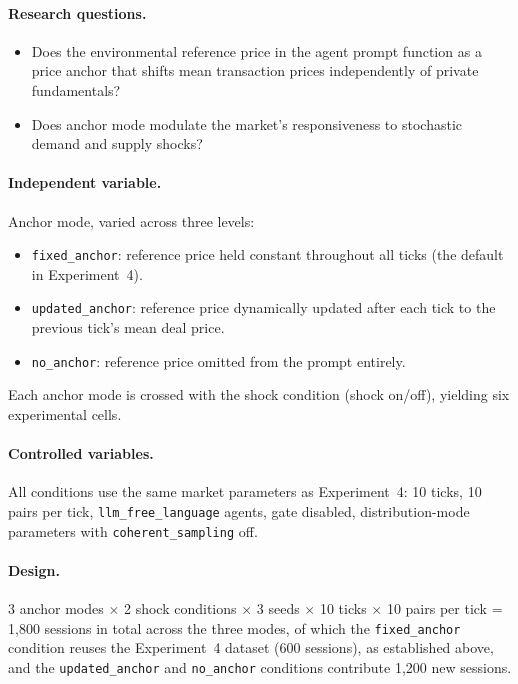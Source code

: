 \paragraph{Research questions.}
\begin{itemize}
    \item[\textbf{RQ-4ext1.}] Does the environmental reference price in the agent prompt function as a price anchor that shifts mean transaction prices independently of private fundamentals?
    \item[\textbf{RQ-4ext2.}] Does anchor mode modulate the market's responsiveness to stochastic demand and supply shocks?
\end{itemize}

\paragraph{Independent variable.}
Anchor mode, varied across three levels:
\begin{itemize}
    \item \texttt{fixed\_anchor}: reference price held constant throughout all ticks (the default in Experiment~4).
    \item \texttt{updated\_anchor}: reference price dynamically updated after each tick to the previous tick's mean deal price.
    \item \texttt{no\_anchor}: reference price omitted from the prompt entirely.
\end{itemize}
Each anchor mode is crossed with the shock condition (shock on/off), yielding six experimental cells.

\paragraph{Controlled variables.}
All conditions use the same market parameters as Experiment~4: 10 ticks, 10 pairs per tick, \texttt{llm\_free\_language} agents, gate disabled, distribution-mode parameters with \texttt{coherent\_sampling} off.

\paragraph{Design.}
3 anchor modes $\times$ 2 shock conditions $\times$ 3 seeds $\times$ 10 ticks $\times$ 10 pairs per tick = 1{,}800 sessions in total across the three modes, of which the \texttt{fixed\_anchor} condition reuses the Experiment~4 dataset (600 sessions), as established above, and the \texttt{updated\_anchor} and \texttt{no\_anchor} conditions contribute 1{,}200 new sessions.

